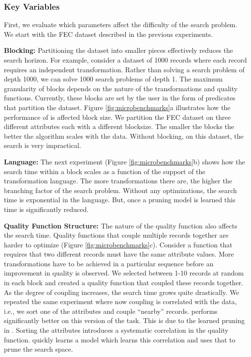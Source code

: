 \subsubsection{Key Variables}
First, we evaluate which parameters affect the difficulty of the search problem. We start with the FEC dataset described in the previous experiments. 

\vspace{0.5em}\noindent \textbf{Blocking: } Partitioning the dataset into smaller pieces effectively reduces the search horizon. For example, consider a dataset of 1000 records where each record requires an independent transformation. Rather than solving a search problem of depth 1000, we can solve 1000 search problems of depth 1.
The maximum granularity of blocks depends on the nature of the transformations and quality functions.
Currently, these blocks are set by the user in the form of predicates that partition the dataset.
Figure \ref{fig:microbenchmarks}a illustrates how the performance of \sys is affected block size. We partition the FEC dataset on three different attributes each with a different blocksize. The smaller the blocks the better the algorithm scales with the data. Without blocking, on this dataset, the search is very impractical.

\vspace{0.5em}\noindent \textbf{Language: } The next experiment (Figure \ref{fig:microbenchmarks}b) shows how the search time within a block scales as a function of the support of the transformation language. The more transformations there are, the higher the branching factor of the search problem. Without any optimizations, the search time is exponential in the language. But, once a pruning model is learned this time is significantly reduced.

\vspace{0.5em}\noindent \textbf{Quality Function Structure: } The nature of the quality function also affects the search time. Quality functions that couple multiple records together are harder to optimize (Figure \ref{fig:microbenchmarks}c).
Consider a function that requires that two different records must have the same attribute values.
More transformations have to be achieved in a particular sequence before an improvement in quality is observed. 
We selected between 1-10 records at random in each block and created a quality function that coupled these records together.
As the degree of coupling increases, the search time grows quite drastically.
We repeated the same experiment where now coupling is correlated with the data, i.e., we sort one of the attributes and couple ``nearby'' records.
\sys performs significantly better on this version of the task.
This is due to the learned pruning in \sys.
Sorting the attributes introduces a systematic correlation in the quality function.
\sys quickly learns a model which learns this correlation and uses that to prune the search space.


